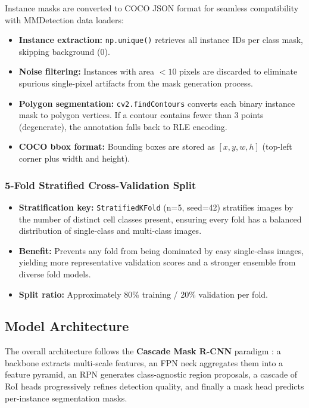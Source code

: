\documentclass[a4paper]{article} %
\begin{document}
Instance masks are converted to COCO JSON format for seamless compatibility with MMDetection data loaders:
\begin{itemize}
    \item \textbf{Instance extraction:} \texttt{np.unique()} retrieves all instance IDs per class mask, skipping background (0).
    \item \textbf{Noise filtering:} Instances with area $< 10$ pixels are discarded to eliminate spurious single-pixel artifacts from the mask generation process.
    \item \textbf{Polygon segmentation:} \texttt{cv2.findContours} converts each binary instance mask to polygon vertices. If a contour contains fewer than 3 points (degenerate), the annotation falls back to RLE encoding.
    \item \textbf{COCO bbox format:} Bounding boxes are stored as $[x, y, w, h]$ (top-left corner plus width and height).
\end{itemize}

\subsubsection{5-Fold Stratified Cross-Validation Split}

\begin{itemize}
    \item \textbf{Stratification key:} \texttt{StratifiedKFold} (n=5, seed=42) stratifies images by the number of distinct cell classes present, ensuring every fold has a balanced distribution of single-class and multi-class images.
    \item \textbf{Benefit:} Prevents any fold from being dominated by easy single-class images, yielding more representative validation scores and a stronger ensemble from diverse fold models.
    \item \textbf{Split ratio:} Approximately 80\% training / 20\% validation per fold.
\end{itemize}

\subsection{Model Architecture}

The overall architecture follows the \textbf{Cascade Mask R-CNN} paradigm \cite{cascade_rcnn, mmdetection}: a backbone extracts multi-scale features, an FPN neck aggregates them into a feature pyramid, an RPN generates class-agnostic region proposals, a cascade of RoI heads progressively refines detection quality, and finally a mask head predicts per-instance segmentation masks.
\end{document}
